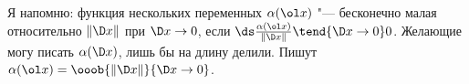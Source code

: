 
	 Я напомню: функция нескольких переменных $\alpha(\ol x)$ "--- бесконечно малая относительно $\|\D x\|$ при $\D x\to 0$, если
	 $\ds\frac{\alpha(\ol x)}{\|\D x\|}\tend{\D x\to 0}0$. Желающие могу писать $\alpha(\D x)$, лишь бы на длину делили.
	 Пишут $\alpha(\ol x) = \ooob{\|\D x\|}{\D x \to 0}$.
	 